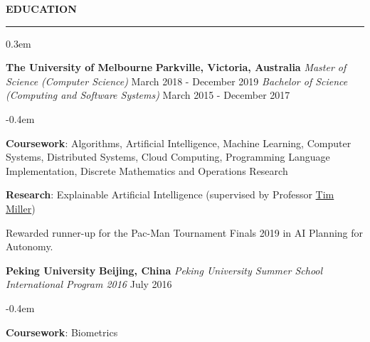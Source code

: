 \documentclass{cv}
\begin{document}
\textbf{\uppercase{Education}}
\sectionlineskip
\hrule height 0.1em
\begin{list}{}{\setlength{\leftmargin}{0em}}
\itemsep 0.3em
\item
    \textbf{The University of Melbourne} \hfill \textbf{Parkville, Victoria, Australia}%
    \vspace{0.1em} \newline
    {\textit{Master of Science (Computer Science)}} \hfill {March 2018 - December 2019}%
    \newline
    {\textit{Bachelor of Science (Computing and Software Systems)}} \hfill {March 2015 - December 2017}%
    \begin{list}{\raisebox{0.2em}{\tiny$\bullet$} \hspace{0em}}{\setlength{\leftmargin}{2.0em}}
        \itemsep -0.4em \vspace{-0.4em}
        \item \textbf{Coursework}: Algorithms, Artificial Intelligence, Machine Learning, Computer Systems, Distributed Systems, Cloud Computing, Programming Language Implementation, Discrete Mathematics and Operations Research
        \item \textbf{Research}: Explainable Artificial Intelligence (supervised by Professor \href{https://eecs.uq.edu.au/profile/9477/tim-miller}{Tim Miller})
        \item Rewarded runner-up for the Pac-Man Tournament Finals 2019 in AI Planning for Autonomy.
    \end{list}
\item
    \textbf{Peking University} \hfill \textbf{Beijing, China}%
    \vspace{0.1em} \newline 
    {\textit{Peking University Summer School International Program 2016}} \hfill {July 2016}%
    \begin{list}{\raisebox{0.2em}{\tiny$\bullet$} \hspace{0em}}{\setlength{\leftmargin}{2.0em}}
        \itemsep -0.4em \vspace{-0.4em}
        \item \textbf{Coursework}: Biometrics
    \end{list}
\end{list}

\end{document}
